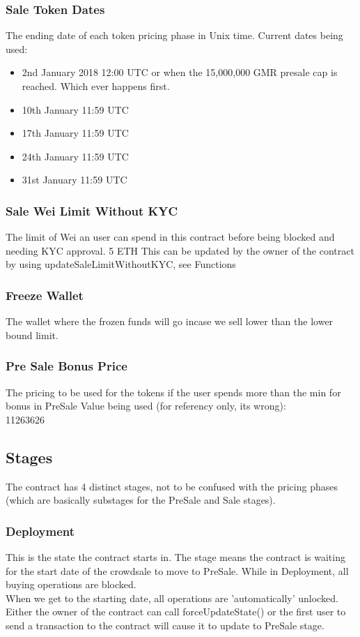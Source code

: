 \documentclass[11pt]{article} %
\begin{document}
\subsubsection{Sale Token Dates}
The ending date of each token pricing phase in Unix time.
Current dates being used:

\begin{itemize}
\item 2nd January 2018 12:00 UTC or when the 15,000,000 GMR presale cap is reached. Which ever happens first.
\item 10th January 11:59 UTC
\item 17th January 11:59 UTC
\item 24th January 11:59 UTC
\item 31st January 11:59 UTC
\end{itemize}


\subsubsection{Sale Wei Limit Without KYC}
The limit of Wei an user can spend in this contract before being blocked and needing KYC approval.
5 ETH
This can be updated by the owner of the contract by using updateSaleLimitWithoutKYC, see Functions


\subsubsection{Freeze Wallet}
The wallet where the frozen funds will go incase we sell lower than the lower bound limit.


\subsubsection{Pre Sale Bonus Price}
The pricing to be used for the tokens if the user spends more than the min for bonus in PreSale
Value being used (for referency only, its wrong): \\
11263626

\subsection{Stages}
The contract has 4 distinct stages, not to be confused with the pricing phases (which are basically substages for the PreSale and Sale stages).

\subsubsection{Deployment}
This is the state the contract starts in. The stage means the contract is waiting for the start date of the crowdsale to move to PreSale.
While in Deployment, all buying operations are blocked.\\
When we get to the starting date, all operations are 'automatically' unlocked. Either the owner of the contract can call forceUpdateState() or the first user to send a transaction to the contract will cause it to update to PreSale stage.
\end{document}

